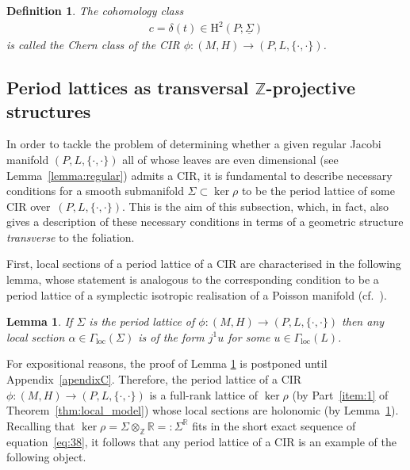 \documentclass[10pt,a4paper]{amsart}
\numberwithin{equation}{section}
\newtheorem{Lemma}[Theorem]{Lemma}
\newtheorem{Definition}[Theorem]{Definition}
\newcommand{\JM}{(P,L,\{\cdot,\cdot\})} %
\newcommand{\CM}{(M,H)} %
\newcommand{\HH}{\mathrm{H}}
\newcommand{\RR}{\mathbb{R}}
\newcommand{\ZZ}{\mathbb{Z}}
\begin{document}
\begin{Definition}\label{defn:cc}
 The cohomology class
 \begin{gather*}
 c = \delta(t) \in \HH^2(P;\underline{\Sigma})
 \end{gather*}
is called the {\it Chern class} of the CIR $\phi \colon \CM \to \JM$.
\end{Definition}

\subsection{Period lattices as transversal $\ZZ$-projective structures}\label{sec:period-lattices-as}
In order to tackle the problem of determining whether a given regular Jacobi mani\-fold $\JM\!$ all of whose leaves are even dimensional (see Lemma~\eqref{lemma:regular}) admits a CIR, it is fundamental to describe necessary conditions for a smooth submanifold $\Sigma \subset \ker \rho$ to be the period lattice of some CIR over~$\JM$. This is the aim of this subsection, which, in fact, also gives a description of these necessary conditions in terms of a geometric structure {\em transverse} to the foliation.

First, local sections of a period lattice of a CIR are characterised in the following lemma, whose statement is analogous to the corresponding condition to be a period lattice of a symplectic isotropic realisation of a Poisson manifold (cf.\ \cite[Corollaire~1]{dd}).

\begin{Lemma}\label{cor:sections_period}
If $\Sigma$ is the period lattice of $\phi \colon \CM \to \JM$ then any local section $\alpha \in \Gamma_{\mathrm{loc}}(\Sigma)$ is of the form $j^1 u$ for some $u \in \Gamma_{\mathrm{loc}}(L)$.
\end{Lemma}

For expositional reasons, the proof of Lemma \ref{cor:sections_period} is postponed until Appendix~\ref{apendixC}. Therefore, the period lattice of a CIR $\phi \colon \CM \to \JM$ is a full-rank lattice of $\ker \rho$ (by Part~\ref{item:1} of Theorem~\ref{thm:local_model}) whose local sections are holonomic (by Lemma~\ref{cor:sections_period}). Recalling that $\ker \rho = \Sigma \otimes_{\ZZ} \RR=: \Sigma^{\RR}$ f\/its in the short exact sequence of equation~\eqref{eq:38}, it follows that any period lattice of a CIR is an example of the following object.
\end{document}
